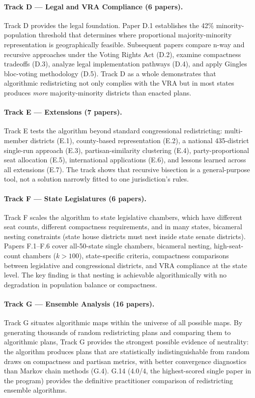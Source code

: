 \paragraph{Track D --- Legal and VRA Compliance (6 papers).}
Track D provides the legal foundation.
Paper D.1 establishes the 42\% minority-population threshold that determines
where proportional majority-minority representation is geographically feasible.
Subsequent papers compare n-way and recursive approaches under the Voting Rights
Act (D.2), examine compactness tradeoffs (D.3), analyze legal implementation
pathways (D.4), and apply Gingles bloc-voting methodology (D.5).
Track D as a whole demonstrates that algorithmic redistricting not only complies
with the VRA but in most states produces \emph{more} majority-minority districts
than enacted plans.

\paragraph{Track E --- Extensions (7 papers).}
Track E tests the algorithm beyond standard congressional redistricting:
multi-member districts (E.1), county-based representation (E.2), a
national 435-district single-run approach (E.3), partisan-similarity
clustering (E.4), party-proportional seat allocation (E.5), international
applications (E.6), and lessons learned across all extensions (E.7).
The track shows that recursive bisection is a general-purpose tool,
not a solution narrowly fitted to one jurisdiction's rules.

\paragraph{Track F --- State Legislatures (6 papers).}
Track F scales the algorithm to state legislative chambers,
which have different seat counts, different compactness requirements,
and in many states, bicameral nesting constraints (state house districts
must nest inside state senate districts).
Papers F.1--F.6 cover all-50-state single chambers, bicameral nesting,
high-seat-count chambers ($k > 100$), state-specific criteria, compactness
comparisons between legislative and congressional districts, and
VRA compliance at the state level.
The key finding is that nesting is achievable algorithmically with no
degradation in population balance or compactness.

\paragraph{Track G --- Ensemble Analysis (16 papers).}
Track G situates algorithmic maps within the universe of all possible maps.
By generating thousands of random redistricting plans and comparing them
to algorithmic plans, Track G provides the strongest possible evidence of
neutrality: the algorithm produces plans that are statistically
indistinguishable from random draws on compactness and partisan metrics,
with better convergence diagnostics than Markov chain methods (G.4).
G.14 (4.0/4, the highest-scored single paper in the program) provides
the definitive practitioner comparison of redistricting ensemble algorithms.

